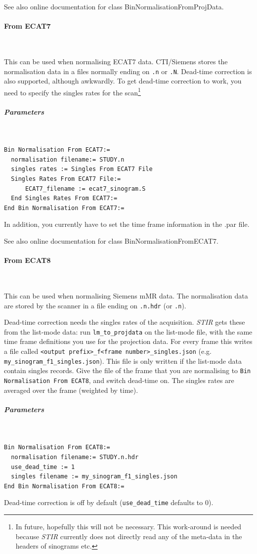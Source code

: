 \documentclass{article}
\newcommand{\subsubsubsection}[1]{\paragraph{#1}\mbox{} \\}
\newcommand{\subsubsubsubsection}[1]{\subparagraph{#1} \mbox{} \\}
\begin{document}
{{{{{{See also online documentation for class BinNormalisationFromProjData.

{ \subsubsubsection{From ECAT7}
}
This can be used when normalising ECAT7 data. CTI/Siemens stores
the normalisation data in a files normally ending on
\texttt{.n} or \texttt{.N}. Dead-time correction is also
supported, although awkwardly. To get dead-time correction
to work, you need to specify the singles rates for the 
scan\footnote{In future, hopefully this will not be necessary.
This work-around is needed because \textit{STIR} currently does not
directly read any of the meta-data in the headers of sinograms etc.}
{ \subsubsubsubsection{Parameters}
}
\begin{verbatim}
Bin Normalisation From ECAT7:=
  normalisation filename:= STUDY.n
  singles rates := Singles From ECAT7 File
  Singles Rates From ECAT7 File:=
      ECAT7_filename := ecat7_sinogram.S
  End Singles Rates From ECAT7:=
End Bin Normalisation From ECAT7:=
\end{verbatim}

In addition, you currently have to set the time frame information in the .par file.

See also online documentation for class BinNormalisationFromECAT7.
{ \subsubsubsection{From ECAT8}
}
This can be used when normalising Siemens mMR data. The normalisation data are
stored by the scanner in a file ending on \texttt{.n.hdr} (or \texttt{.n}).

Dead-time correction needs the singles rates of the acquisition. \textit{STIR} gets
these from the list-mode data: run \texttt{lm\_to\_projdata} on the list-mode file, with
the same time frame definitions you use for the projection data. For every frame this
writes a file called \texttt{<output prefix>\_f<frame number>\_singles.json}
(e.g. \texttt{my\_sinogram\_f1\_singles.json}). This file is only written if the
list-mode data contain singles records. Give the file of the frame that you are
normalising to \texttt{Bin Normalisation From ECAT8}, and switch dead-time on.
The singles rates are averaged over the frame (weighted by time).
{ \subsubsubsubsection{Parameters}
}
\begin{verbatim}
Bin Normalisation From ECAT8:=
  normalisation filename:= STUDY.n.hdr
  use_dead_time := 1
  singles filename := my_sinogram_f1_singles.json
End Bin Normalisation From ECAT8:=
\end{verbatim}

Dead-time correction is off by default (\texttt{use\_dead\_time} defaults to 0).

}}}}}}
\end{document}
